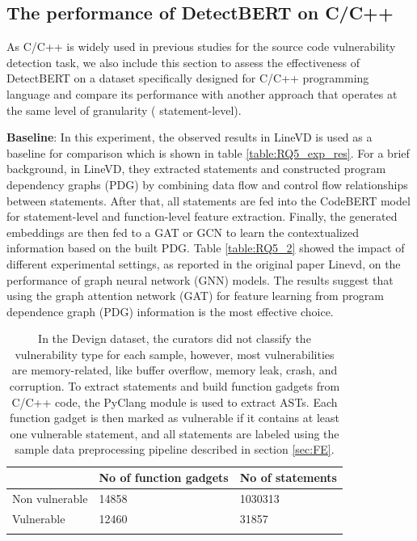 \documentclass{ieeeaccess}
\begin{document}
\subsection{The performance of DetectBERT on C/C++}\label{sec:C++}
As C/C++ is widely used in previous studies for the source code vulnerability detection task, we also include this section to assess the effectiveness of DetectBERT on a dataset specifically designed for C/C++ programming language and compare its performance with another approach that operates at the same level of granularity ( statement-level). 
 \par \textbf{Baseline}: In this experiment, the observed results in LineVD \cite{Linevd} is used as a baseline for comparison which is shown in table \ref{table:RQ5_exp_res}. For a brief background, in LineVD, they  extracted statements and constructed  program dependency graphs (PDG)  by combining data flow and control flow relationships between statements. After that, all statements are fed into the CodeBERT \cite{codebert} model for statement-level and function-level feature extraction. Finally,  the generated embeddings are then fed to a GAT or GCN to learn the contextualized information based on the built PDG.  Table \ref{table:RQ5_2}  showed the impact of different experimental settings, as reported in the original paper Linevd\cite{Linevd}, on the performance of graph neural network (GNN) models. The results suggest that using the graph attention network (GAT) for feature learning from program dependence graph (PDG) information is the most effective choice. 
\begin{table}[h]
\centering

\label{table:data_stat_c}
\begin{tabular}{lll}
\Xhline{2\arrayrulewidth}
\textbf{} & \textbf{No of function gadgets} & \textbf{No of statements} \\
\hline
Non vulnerable & 14858 & 1030313\\ 
Vulnerable  & 12460 & 31857 \\ 
\Xhline{2\arrayrulewidth}
\end{tabular}
\caption{ In the Devign dataset, the curators did not classify the vulnerability type for each sample, however, most vulnerabilities are memory-related, like buffer overflow, memory leak, crash, and corruption. To extract statements and build function gadgets from C/C++ code,  the PyClang module is used to extract ASTs. Each function gadget is then marked as vulnerable if it contains at least one vulnerable statement, and all statements are labeled using the sample data preprocessing pipeline described in section \ref{sec:FE}. }
\end{table} 
\end{document}

